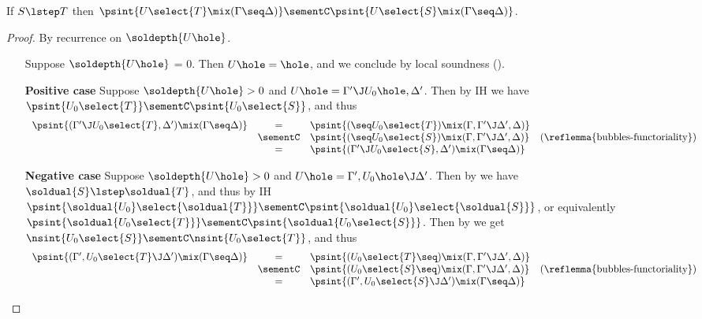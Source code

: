 \begin{lemma}

  If $S \lstep T$ then $\psint{U\select{T} \mix (\Gamma \seq \Delta)} \sementC
  \psint{U\select{S} \mix (\Gamma \seq \Delta)}$.
\end{lemma}
\begin{proof}
  By recurrence on $\soldepth{U\hole}$.
  \begin{itemize}
    \item[\bcase] Suppose $\soldepth{U\hole}$ = 0. Then $U\hole =
    \hole$, and we conclude by local soundness
    ().
    \item[\textbf{Positive case}] Suppose $\soldepth{U\hole} > 0$ and $U\hole =
    \Gamma' \J U_0\hole, \Delta'$. Then by IH we have $\psint{U_0\select{T}}
    \sementC \psint{U_0\select{S}}$, and thus
    $$
    \begin{array}{rcll}
      \psint{(\Gamma' \J U_0\select{T}, \Delta') \mix (\Gamma \seq \Delta)}
      &=& \psint{(\seq U_0\select{T}) \mix (\Gamma, \Gamma' \J \Delta', \Delta)} &\\
      &\sementC& \psint{(\seq U_0\select{S}) \mix (\Gamma, \Gamma' \J \Delta', \Delta)} &\text{(\reflemma{bubbles-functoriality})}\\
      &=& \psint{(\Gamma' \J U_0\select{S}, \Delta') \mix (\Gamma \seq \Delta)} &
    \end{array}
    $$

    \item[\textbf{Negative case}] Suppose $\soldepth{U\hole} > 0$ and $U\hole =
    \Gamma', U_0\hole \J \Delta'$. Then by  we have
    $\soldual{S} \lstep \soldual{T}$, and thus by IH
    $\psint{\soldual{U_0}\select{\soldual{T}}} \sementC
    \psint{\soldual{U_0}\select{\soldual{S}}}$, or equivalently
    $\psint{\soldual{U_0\select{T}}} \sementC \psint{\soldual{U_0\select{S}}}$.
    Then by  we get $\nsint{U_0\select{S}} \sementC
    \nsint{U_0\select{T}}$, and thus
    $$
    \begin{array}{rcll}
      \psint{(\Gamma', U_0\select{T} \J \Delta') \mix (\Gamma \seq \Delta)}
      &=& \psint{(U_0\select{T} \seq) \mix (\Gamma, \Gamma' \J \Delta', \Delta)} &\\
      &\sementC& \psint{(U_0\select{S} \seq) \mix (\Gamma, \Gamma' \J \Delta', \Delta)} &\text{(\reflemma{bubbles-functoriality})}\\
      &=& \psint{(\Gamma', U_0\select{S} \J \Delta') \mix (\Gamma \seq \Delta)} &
    \end{array}
    $$


\end{itemize}
\end{proof}
